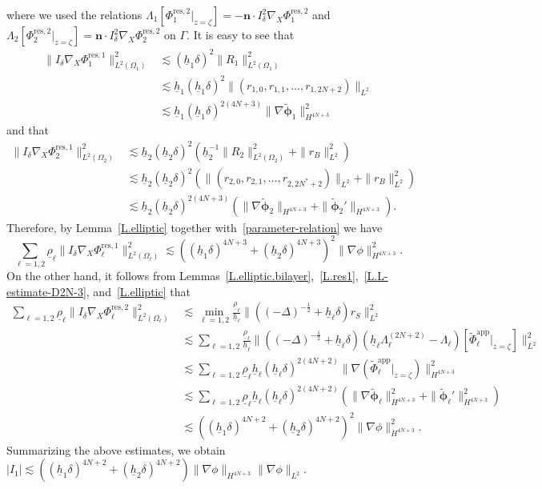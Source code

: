 \documentclass[11pt,leqno]{article}
\numberwithin{equation}{section}
\numberwithin{figure}{section}
\begin{document}
%
where we used the relations $\Lambda_1[\Phi_1^\mathrm{res,2}|_{z=\zeta}] = - \bm{n}\cdot I_\delta^2\nabla_X\Phi_1^\mathrm{res,2}$ 
and $\Lambda_2[\Phi_2^\mathrm{res,2}|_{z=\zeta}] = \bm{n}\cdot I_\delta^2\nabla_X\Phi_2^\mathrm{res,2}$ on $\Gamma$. 
It is easy to see that 
%
\begin{align*}
\|I_\delta\nabla_X\Phi_1^\mathrm{res,1}\|_{L^2(\Omega_1)}^2
&\lesssim (\underline{h}_1\delta)^2\|R_1\|_{L^2(\Omega_1)}^2 \\
&\lesssim \underline{h}_1(\underline{h}_1\delta)^2\|(r_{1,0},r_{1,1},\ldots,r_{1,2N+2})\|_{L^2} \\
&\lesssim \underline{h}_1(\underline{h}_1\delta)^{2(4N+3)}\|\nabla\tilde{\bm{\phi}}_1\|_{H^{4N+3}}^2
\end{align*}
%
and that 
%
\begin{align*}
\|I_\delta\nabla_X\Phi_2^\mathrm{res,1}\|_{L^2(\Omega_2)}^2
&\lesssim \underline{h}_2(\underline{h}_2\delta)^2( \underline{h}_2^{-1}\|R_2\|_{L^2(\Omega_2)}^2 + \|r_B\|_{L^2}^2 ) \\
&\lesssim \underline{h}_2(\underline{h}_2\delta)^2( \|(r_{2,0},r_{2,1},\ldots,r_{2,2N^*+2})\|_{L^2} + \|r_B\|_{L^2}^2 ) \\
&\lesssim \underline{h}_2(\underline{h}_2\delta)^{2(4N+3)}
 ( \|\nabla\tilde{\bm{\phi}}_2\|_{H^{4N+3}}+\|\tilde{\bm{\phi}}_2'\|_{H^{4N+3}} ).
\end{align*}
%
Therefore, by Lemma~\ref{L.elliptic} together with~\eqref{parameter-relation} we have 
%
\[
\sum_{\ell=1,2}\underline{\rho}_\ell\|I_\delta\nabla_X\Phi_\ell^\mathrm{res,1}\|_{L^2(\Omega_\ell)}^2
\lesssim ((\underline{h}_1\delta)^{4N+3} + (\underline{h}_2\delta)^{4N+3})^2\|\nabla\phi\|_{H^{4N+3}}^2.
\]
%
On the other hand, it follows from Lemmas~\ref{L.elliptic.bilayer},~\ref{L.res1},~\ref{L.L-estimate-D2N-3}, 
and~\ref{L.elliptic} that 
%
\begin{align*}
\sum_{\ell=1,2}\underline{\rho}_\ell\|I_\delta\nabla_X\Phi_\ell^\mathrm{res,2}\|_{L^2(\Omega_\ell)}^2
&\lesssim \min_{\ell=1,2} \frac{\underline{\rho}_\ell}{\underline{h}_\ell}
 \|((-\Delta)^{-\frac12} + \underline{h}_\ell\delta)r_S\|_{L^2}^2 \\
&\lesssim \sum_{\ell=1,2} \frac{\underline{\rho}_\ell}{\underline{h}_\ell}
 \|((-\Delta)^{-\frac12} + \underline{h}_\ell\delta)(\underline{h}_\ell\Lambda_\ell^{(2N+2)}-\Lambda_\ell)
  [\tilde{\Phi}_\ell^\mathrm{app}|_{z=\zeta}]\|_{L^2}^2 \\
&\lesssim \sum_{\ell=1,2} \underline{\rho}_\ell\underline{h}_\ell
 (\underline{h}_\ell\delta)^{2(4N+2)}\|\nabla(\tilde{\Phi}_\ell^\mathrm{app}|_{z=\zeta})\|_{H^{4N+3}}^2 \\
&\lesssim \sum_{\ell=1,2} \underline{\rho}_\ell\underline{h}_\ell
 (\underline{h}_\ell\delta)^{2(4N+2)} (\|\nabla\tilde{\bm{\phi}}_\ell\|_{H^{4N+3}}^2 + \|\tilde{\bm{\phi}}_\ell'\|_{H^{4N+3}}^2 ) \\
&\lesssim ((\underline{h}_1\delta)^{4N+2} + (\underline{h}_2\delta)^{4N+2})^2\|\nabla\phi\|_{H^{4N+3}}^2.
\end{align*}
%
Summarizing the above estimates, we obtain 
$|I_1| \lesssim ((\underline{h}_1\delta)^{4N+2} + (\underline{h}_2\delta)^{4N+2})\|\nabla\phi\|_{H^{4N+3}}\|\nabla\phi\|_{L^2}$. 
\end{document}
